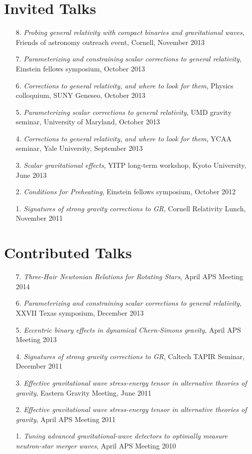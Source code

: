 \section{\sc Invited Talks}
\begin{enumerate}
\item[{8.}] {\it Probing general relativity with compact binaries and
    gravitational waves},
  Friends of astronomy outreach event, Cornell, November 2013
\item[{7.}] {\it Parameterizing and constraining scalar corrections to general relativity},
  Einstein fellows symposium, October 2013
\item[{6.}] {\it Corrections to general relativity, and where to look for them},
  Physics colloquium, SUNY Geneseo, October 2013
\item[{5.}] {\it Parameterizing scalar corrections to general relativity}, UMD gravity seminar,
 University of Maryland, October 2013
\item[{4.}] {\it Corrections to general relativity, and where to look for them},
  YCAA seminar, Yale University, September 2013
\item[{3.}] {\it Scalar gravitational effects}, YITP long-term
  workshop, Kyoto University, June 2013
\item[{2.}] {\it Conditions for Preheating},
  Einstein fellows symposium, October 2012
\item[{1.}] {\it Signatures of strong gravity corrections to GR},
  Cornell Relativity Lunch, November 2011
\end{enumerate}

\section{\sc Contributed Talks}
\begin{enumerate}
\item[{7.}] {\it Three-Hair Newtonian Relations for Rotating Stars},
 April APS Meeting 2014
\item[{6.}] {\it Parameterizing and constraining scalar corrections to general relativity},
 XXVII Texas symposium, December 2013
\item[{5.}] {\it Eccentric binary effects in dynamical Chern-Simons gravity},
  April APS Meeting 2013
\item[{4.}] {\it Signatures of strong gravity corrections to GR},
  Caltech TAPIR Seminar, December 2011
\item[{3.}] {\it Effective gravitational wave stress-energy tensor in
    alternative theories of gravity}, Eastern Gravity Meeting, June 2011
\item[{2.}] {\it Effective gravitational wave stress-energy tensor in alternative theories of gravity}, April APS Meeting 2011
\item[{1.}] {\it Tuning advanced gravitational-wave detectors to
    optimally measure neutron-star merger waves}, April APS Meeting 2010
\end{enumerate}



